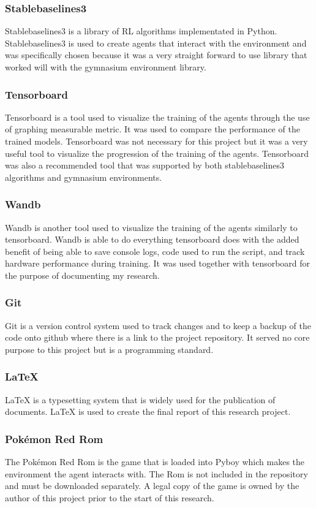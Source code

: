 \subsubsection*{Stablebaselines3}
Stablebaselines3 is a library of RL algorithms implementated in Python. Stablebaselines3 is used to create agents that interact with the environment and was specifically chosen because it was a very straight forward to use library that worked will with the gymnasium environment library.

\subsubsection*{Tensorboard}
Tensorboard is a tool used to visualize the training of the agents through the use of graphing measurable metric. It was used to compare the performance of the trained models. Tensorboard was not necessary for this project but it was a very useful tool to visualize the progression of the training of the agents. Tensorboard was also a recommended tool that was supported by both stablebaselines3 algorithms and gymnasium environments.

\subsubsection*{Wandb}
Wandb is another tool used to visualize the training of the agents similarly to tensorboard. Wandb is able to do everything tensorboard does with the added benefit of being able to save console logs, code used to run the script, and track hardware performance during training. It was used together with tensorboard for the purpose of documenting my research.

\subsubsection*{Git}
Git is a version control system used to track changes and to keep a backup of the code onto github where there is a link to the project repository. It served no core purpose to this project but is a programming standard. 

\subsubsection*{LaTeX}
LaTeX is a typesetting system that is widely used for the publication of documents. LaTeX is used to create the final report of this research project.

\subsubsection*{Pokémon Red Rom}
The Pokémon Red Rom is the game that is loaded into Pyboy which makes the environment the agent interacts with. The Rom is not included in the repository and must be downloaded separately. A legal copy of the game is owned by the author of this project prior to the start of this research.


